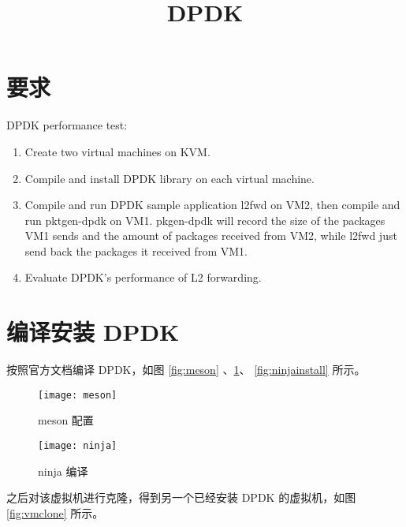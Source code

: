 

    \title{DPDK}
    \maketitle
    \tableofcontents
    \section{要求}

    DPDK performance test:

    \begin{enumerate}[(1)]
        \item Create two virtual machines on KVM.
        \item Compile and install DPDK library on each virtual machine.
        \item Compile and run DPDK sample application l2fwd on VM2, then compile and run pktgen-dpdk on VM1.  pkgen-dpdk will record the size of the packages VM1 sends and the amount of packages received from VM2,  while l2fwd just send back the packages it received from VM1.
        \item Evaluate DPDK's performance of L2 forwarding.
    \end{enumerate}

    \section{编译安装 DPDK}\label{sec:compile}

    按照官方文档\cite{dpdk}编译 DPDK，如图 \ref{fig:meson} 、\ref{fig:ninja}、 \ref{fig:ninjainstall} 所示。


    \begin{figure}[H]
        \centering
        \begin{minipage}{0.48\textwidth}
            \centering
            \texttt{[image: meson]}
            \caption{meson 配置}\label{fig:meson}
        \end{minipage}
        \begin{minipage}{0.48\textwidth}
            \centering
            \texttt{[image: ninja]}
            \caption{ninja 编译}\label{fig:ninja}
        \end{minipage}
    \end{figure}

    之后对该虚拟机进行克隆，得到另一个已经安装 DPDK 的虚拟机，如图 \ref{fig:vmclone} 所示。

